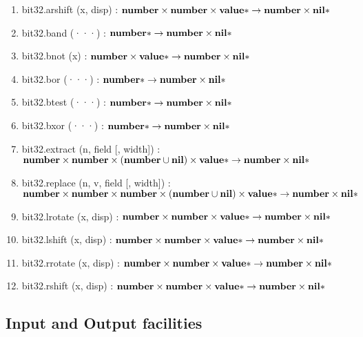 \begin{enumerate}
\item bit32.arshift (x, disp) :
$\mathbf{number} \times \mathbf{number} \times \mathbf{value}{*} \rightarrow \mathbf{number} \times \mathbf{nil}{*}$
\item bit32.band (···) :
$\mathbf{number}{*} \rightarrow \mathbf{number} \times \mathbf{nil}{*}$
\item bit32.bnot (x) :
$\mathbf{number} \times \mathbf{value}{*} \rightarrow \mathbf{number} \times \mathbf{nil}{*}$
\item bit32.bor (···) :
$\mathbf{number}{*} \rightarrow \mathbf{number} \times \mathbf{nil}{*}$
\item bit32.btest (···) :
$\mathbf{number}{*} \rightarrow \mathbf{number} \times \mathbf{nil}{*}$
\item bit32.bxor (···) :
$\mathbf{number}{*} \rightarrow \mathbf{number} \times \mathbf{nil}{*}$
\item bit32.extract (n, field [, width]) :
$\mathbf{number} \times
\mathbf{number} \times
(\mathbf{number} \cup \mathbf{nil}) \times
\mathbf{value}{*} \rightarrow
\mathbf{number} \times
\mathbf{nil}{*}$
\item bit32.replace (n, v, field [, width]) :
$\mathbf{number} \times
\mathbf{number} \times
\mathbf{number} \times
(\mathbf{number} \cup \mathbf{nil}) \times
\mathbf{value}{*} \rightarrow
\mathbf{number} \times
\mathbf{nil}{*}$
\item bit32.lrotate (x, disp) :
$\mathbf{number} \times \mathbf{number} \times \mathbf{value}{*} \rightarrow \mathbf{number} \times \mathbf{nil}{*}$
\item bit32.lshift (x, disp) :
$\mathbf{number} \times \mathbf{number} \times \mathbf{value}{*} \rightarrow \mathbf{number} \times \mathbf{nil}{*}$
\item bit32.rrotate (x, disp) :
$\mathbf{number} \times \mathbf{number} \times \mathbf{value}{*} \rightarrow \mathbf{number} \times \mathbf{nil}{*}$
\item bit32.rshift (x, disp) :
$\mathbf{number} \times \mathbf{number} \times \mathbf{value}{*} \rightarrow \mathbf{number} \times \mathbf{nil}{*}$
\end{enumerate}

\subsection{Input and Output facilities}

